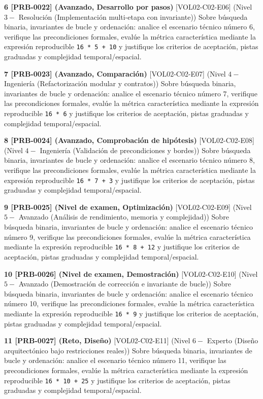 \documentclass{book}
\begin{document}
\begin{tcolorbox}[title={Ejercicios}, studiumworked, breakable]
\noindent\textbf{6 [PRB-0022] (Avanzado, Desarrollo por pasos)}
[VOL02-C02-E06] (Nivel \(3 -\) Resolución (Implementación multi-etapa con invariante)) Sobre búsqueda binaria, invariantes de bucle y ordenación: analice el escenario técnico número 6, verifique las precondiciones formales, evalúe la métrica característica mediante la expresión reproducible \texttt{16 * 5 + 10} y justifique los criterios de aceptación, pistas graduadas y complejidad temporal/espacial.

\noindent\textbf{7 [PRB-0023] (Avanzado, Comparación)}
[VOL02-C02-E07] (Nivel \(4 -\) Ingeniería (Refactorización modular y contratos)) Sobre búsqueda binaria, invariantes de bucle y ordenación: analice el escenario técnico número 7, verifique las precondiciones formales, evalúe la métrica característica mediante la expresión reproducible \texttt{16 * 6} y justifique los criterios de aceptación, pistas graduadas y complejidad temporal/espacial.

\noindent\textbf{8 [PRB-0024] (Avanzado, Comprobación de hipótesis)}
[VOL02-C02-E08] (Nivel \(4 -\) Ingeniería (Validación de precondiciones y bordes)) Sobre búsqueda binaria, invariantes de bucle y ordenación: analice el escenario técnico número 8, verifique las precondiciones formales, evalúe la métrica característica mediante la expresión reproducible \texttt{16 * 7 + 3} y justifique los criterios de aceptación, pistas graduadas y complejidad temporal/espacial.

\noindent\textbf{9 [PRB-0025] (Nivel de examen, Optimización)}
[VOL02-C02-E09] (Nivel \(5 -\) Avanzado (Análisis de rendimiento, memoria y complejidad)) Sobre búsqueda binaria, invariantes de bucle y ordenación: analice el escenario técnico número 9, verifique las precondiciones formales, evalúe la métrica característica mediante la expresión reproducible \texttt{16 * 8 + 12} y justifique los criterios de aceptación, pistas graduadas y complejidad temporal/espacial.

\noindent\textbf{10 [PRB-0026] (Nivel de examen, Demostración)}
[VOL02-C02-E10] (Nivel \(5 -\) Avanzado (Demostración de corrección e invariante de bucle)) Sobre búsqueda binaria, invariantes de bucle y ordenación: analice el escenario técnico número 10, verifique las precondiciones formales, evalúe la métrica característica mediante la expresión reproducible \texttt{16 * 9} y justifique los criterios de aceptación, pistas graduadas y complejidad temporal/espacial.

\noindent\textbf{11 [PRB-0027] (Reto, Diseño)}
[VOL02-C02-E11] (Nivel \(6 -\) Experto (Diseño arquitectónico bajo restricciones reales)) Sobre búsqueda binaria, invariantes de bucle y ordenación: analice el escenario técnico número 11, verifique las precondiciones formales, evalúe la métrica característica mediante la expresión reproducible \texttt{16 * 10 + 25} y justifique los criterios de aceptación, pistas graduadas y complejidad temporal/espacial.


\end{tcolorbox}
\end{document}
